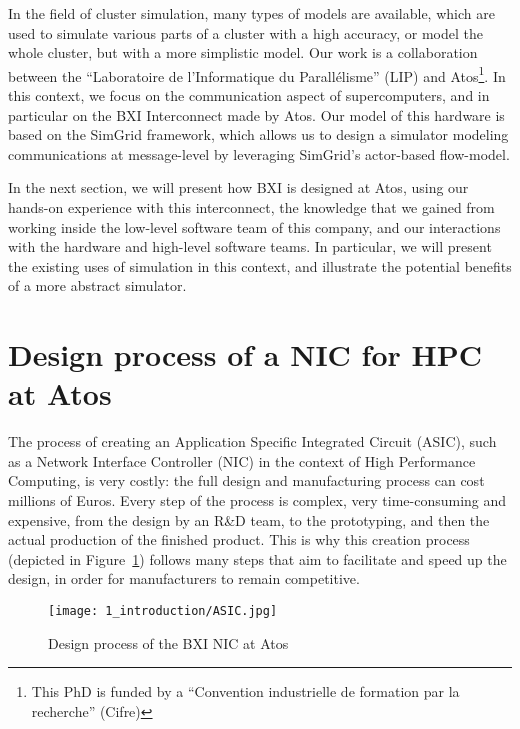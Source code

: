 In the field of cluster simulation, many types of models are available, which
are used to simulate various parts of a cluster with a high accuracy, or model
the whole cluster, but with a more simplistic model. Our work is a collaboration
between the ``Laboratoire de l'Informatique du Parallélisme'' (LIP) and
Atos\footnote{This PhD is funded by a ``Convention industrielle de formation par
la recherche'' (Cifre)}. In this context, we focus on the communication aspect
of supercomputers, and in particular on the BXI Interconnect made by Atos. Our
model of this hardware is based on the SimGrid framework, which allows us to
design a simulator modeling communications at message-level by leveraging
SimGrid's actor-based flow-model.

In the next section, we will present how BXI is designed at Atos, using our
hands-on experience with this interconnect, the knowledge that we gained from
working inside the low-level software team of this company, and our interactions
with the hardware and high-level software teams. In particular, we will present
the existing uses of simulation in this context, and illustrate the potential
benefits of a more abstract simulator.

\section{Design process of a NIC for HPC at Atos}

The process of creating an Application Specific Integrated Circuit (ASIC), such
as a Network Interface Controller (NIC) in the context of High Performance
Computing, is very costly: the full design and manufacturing process can cost
millions of Euros. Every step of the process is complex, very time-consuming and
expensive, from the design by an R\&D team, to the prototyping, and then the
actual production of the finished product. This is why this creation process
(depicted in Figure~\ref{fig:1_introduction:ASIC}) follows many steps that aim
to facilitate and speed up the design, in order for manufacturers to remain
competitive. 

\begin{figure}[!ht]
    \centering
    \texttt{[image: 1\_introduction/ASIC.jpg]}
    \caption{Design process of the BXI NIC at Atos}
    \label{fig:1_introduction:ASIC}
\end{figure}

